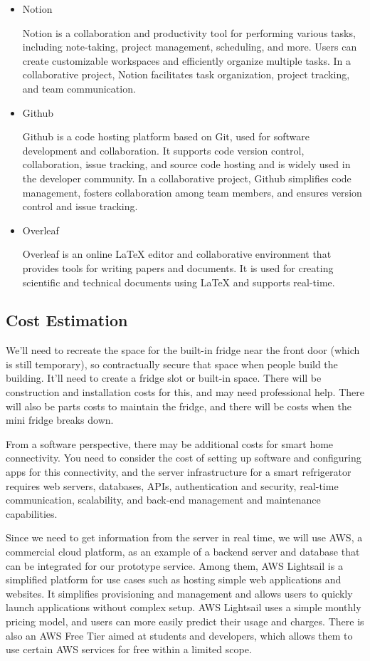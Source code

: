 \documentclass[conference]{IEEEtran}
\begin{document}
\begin{itemize}
    \item Notion \par
    Notion is a collaboration and productivity tool for performing various tasks, including note-taking, project management, scheduling, and more. Users can create customizable workspaces and efficiently organize multiple tasks. In a collaborative project, Notion facilitates task organization, project tracking, and team communication.
    \item Github \par
    Github is a code hosting platform based on Git, used for software development and collaboration. It supports code version control, collaboration, issue tracking, and source code hosting and is widely used in the developer community. In a collaborative project, Github simplifies code management, fosters collaboration among team members, and ensures version control and issue tracking.
     \item Overleaf \par
    Overleaf is an online LaTeX editor and collaborative environment that provides tools for writing papers and documents. It is used for creating scientific and technical documents using LaTeX and supports real-time.
    
    
\end{itemize}
\subsection{Cost Estimation}
We'll need to recreate the space for the built-in fridge near the front door (which is still temporary), so contractually secure that space when people build the building. It'll need to create a fridge slot or built-in space. There will be construction and installation costs for this, and may need professional help. There will also be parts costs to maintain the fridge, and there will be costs when the mini fridge breaks down.

From a software perspective, there may be additional costs for smart home connectivity. You need to consider the cost of setting up software and configuring apps for this connectivity, and the server infrastructure for a smart refrigerator requires web servers, databases, APIs, authentication and security, real-time communication, scalability, and back-end management and maintenance capabilities.

Since we need to get information from the server in real time, we will use AWS, a commercial cloud platform, as an example of a backend server and database that can be integrated for our prototype service. Among them, AWS Lightsail is a simplified platform for use cases such as hosting simple web applications and websites. It simplifies provisioning and management and allows users to quickly launch applications without complex setup. AWS Lightsail uses a simple monthly pricing model, and users can more easily predict their usage and charges. There is also an AWS Free Tier aimed at students and developers, which allows them to use certain AWS services for free within a limited scope.
\end{document}
